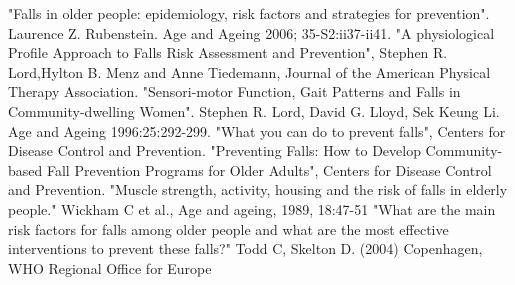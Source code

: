 \begin{thebibliography}{99}
"Falls in older people: epidemiology, risk factors and strategies for prevention". Laurence Z. Rubenstein. Age and Ageing 2006; 35-S2:ii37-ii41.
"A physiological Profile Approach to Falls Risk Assessment and Prevention", Stephen R. Lord,Hylton B. Menz and Anne Tiedemann, Journal of the American Physical Therapy Association. 
"Sensori-motor Function, Gait Patterns and Falls in Community-dwelling Women". Stephen R. Lord, David G. Lloyd, Sek Keung Li. Age and Ageing 1996:25:292-299.
"What you can do to prevent falls", Centers for Disease Control and Prevention.
"Preventing Falls: How to Develop Community-based Fall Prevention Programs for Older Adults", Centers for Disease Control and Prevention.
"Muscle strength, activity, housing and the risk of falls in elderly people." Wickham C et al., Age and ageing, 1989, 18:47-51 
"What are the main risk factors for falls among older people and what are the most effective interventions to prevent these falls?" Todd C, Skelton D. (2004) Copenhagen, WHO Regional Office for Europe 
 
\end{thebibliography}